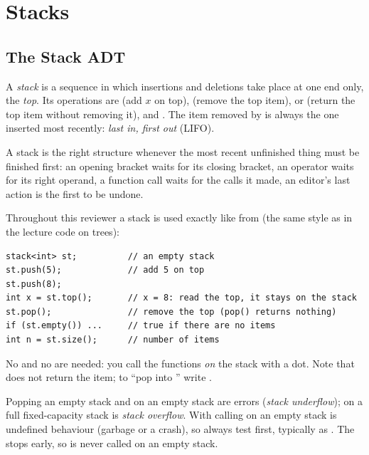 \chapter{Stacks}\label{ch:stacks}

\section{The Stack ADT}

\begin{definition}[Stack]
A \emph{stack} is a sequence in which insertions and deletions take place at one end
only, the \emph{top}. Its operations are  (add $x$ on top), 
(remove the top item),  or  (return the top item without
removing it),  and . The item removed by  is always the
one inserted most recently: \emph{last in, first out} (LIFO).
\end{definition}

A stack is the right structure whenever the most recent unfinished thing must be
finished first: an opening bracket waits for its closing bracket, an operator waits for
its right operand, a function call waits for the calls it made, an editor's last action
is the first to be undone.

 Throughout this reviewer a stack is used exactly like
 from  (the same style as  in the lecture
code on trees):
\begin{lstlisting}[style=starter]
stack<int> st;          // an empty stack
st.push(5);             // add 5 on top
st.push(8);
int x = st.top();       // x = 8: read the top, it stays on the stack
st.pop();               // remove the top (pop() returns nothing)
if (st.empty()) ...     // true if there are no items
int n = st.size();      // number of items
\end{lstlisting}
No \cc{\&} and no \cc{*} are needed: you call the functions \emph{on} the stack with a
dot. Note that  does not return the item; to ``pop into '' write
.

\begin{note}{Popping an empty stack}
 and  on an empty stack are errors (\emph{stack underflow});  on
a full fixed-capacity stack is \emph{stack overflow}. With  calling
 on an empty stack is undefined behaviour (garbage or a crash), so always
test  first, typically as .
The \cc{\&\&} stops early, so  is never called on an empty stack.
\end{note}

